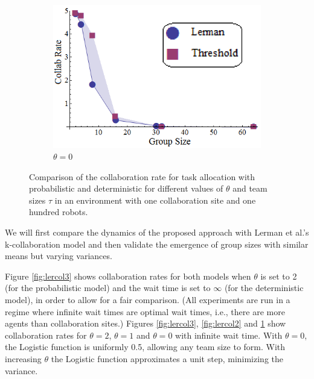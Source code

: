 \documentclass{svmult}  %
\begin{document}
\begin{figure}[!htb]
\begin{subfigure}{0.33\textwidth}
\centering\includegraphics[width=1.0\textwidth]{figures/LermanCollabCompare1New.png}
\centering\caption{$\theta=0$}\label{fig:lercol1}
\end{subfigure}
\caption{Comparison of the collaboration rate for task allocation with probabilistic and deterministic \cite{Lerman2001} for different values of $\theta$ and team sizes $\tau$ in an environment with one collaboration site and one hundred robots. }\label{fig:lercol}
\end{figure}

We will first compare the dynamics of the proposed approach with Lerman et al.'s k-collaboration model \cite{Lerman2001} and then validate the emergence of group sizes with similar means but varying variances.

Figure \ref{fig:lercol3} shows collaboration rates for both models when $\theta$ is set to 2 (for the probabilistic model) and the wait time is set to $\infty$ (for the deterministic model), in order to allow for a fair comparison. (All experiments are run in a regime where infinite wait times are optimal wait times, i.e., there are more agents than collaboration sites.) Figures \ref{fig:lercol3}, \ref{fig:lercol2} and \ref{fig:lercol1} show collaboration rates for $\theta = 2$, $\theta = 1$ and $\theta=0$ with infinite wait time. With $\theta=0$, the Logistic function is uniformly 0.5, allowing any team size to form.  
With increasing $\theta$ the Logistic function approximates a unit step, minimizing the variance. 
\end{document}

